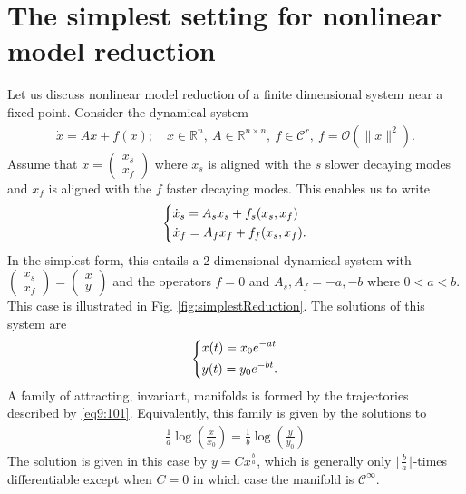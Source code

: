 \section{The simplest setting for nonlinear model reduction}
Let us discuss nonlinear model reduction of a finite dimensional system near a fixed point. Consider the dynamical system
\begin{align}
\dot{x} = Ax + f(x);\quad x \in \mathbb{R}^{n},\ A \in \mathbb{R}^{n\times n},\ f\in \mathcal{C}^{r},\ f=\mathcal{O}\left(\|x\|^{2}\right).
\end{align}
Assume that $x=
\begin{pmatrix}
	x_s \\ x_f
\end{pmatrix}
$ where $x_s$ is aligned with the $s$ slower decaying modes and $x_f $ is aligned with the $f$ faster decaying modes. This enables us to write
\begin{align} \label{eq9:approx_inert_mfd}
	\begin{dcases}
		\dot{x}_s = A_{s}x_{s} + f_s(x_s, x_f) \\
		\dot{x}_f = A_{f}x_{f} + f_f(x_s, x_f). 
	\end{dcases}
\end{align}
In the simplest form, this entails a 2-dimensional dynamical system with $
\begin{pmatrix}
	x_s \\ x_f
\end{pmatrix}
=
\begin{pmatrix}
	x \\y
\end{pmatrix}
$ and the operators $f=0$ and $A_s,A_f = -a,-b$ where $0<a<b$. This case is illustrated in Fig. \ref{fig:simplestReduction}. The solutions of this system are
\begin{align}
	\begin{dcases}
		x(t) = x_0 e^{-at} \\
		y(t) = y_0 e^{-bt}.
	\end{dcases} \label{eq9:101}
\end{align}
A family of attracting, invariant, manifolds is formed by the trajectories described by \eqref{eq9:101}. Equivalently, this family is given by the solutions to 
\begin{align}
	\frac{1}{a}\log\left(\frac{x}{x_0}\right) =\frac{1}{b}\log\left(\frac{y}{y_0}\right)
\end{align}
The solution is given in this case by $y = C x^{\frac{b}{a}}$, which is generally only $\lfloor \frac{b}{a} \rfloor$-times differentiable except when $C=0$ in which case the manifold is $\mathcal{C}^{\infty }$.
